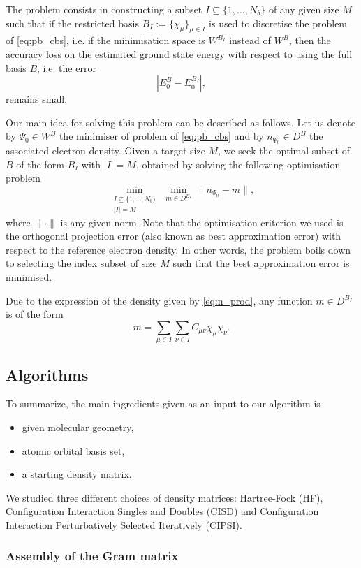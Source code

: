 \documentclass[a4paper,11pt]{article}
\begin{document}
The problem consists in constructing a subset $I\subseteq\{1,\ldots,N_b\}$ of
any given size $M$ such that if the restricted basis 
$B_I:=\{\chi_{\mu}\}_{\mu \in I}$ is used to discretise the problem of
\cref{eq:pb_cbs}, i.e. if the minimisation space is $W^{B_I}$ instead of $W^B$, 
then the accuracy loss on the estimated ground state energy with respect to 
using the full basis $B$, i.e. the error
\[
    |E_0^B - E_0^{B_I}|,
\]
remains small.

Our main idea for solving this problem can be described as follows. 
Let us denote by $\Psi_0\in W^B$ the minimiser of problem of \cref{eq:pb_cbs} 
and by $n_{\Psi_0}\in D^B$ the associated electron density. Given a target size
$M$, we seek the optimal subset of $B$ of the form $B_I$ with
$|I|=M$, obtained by solving the following optimisation problem
\[
    \min_{\substack{I\subseteq\{1,\ldots,N_b\} \\ |I|=M}}\,
    \min_{m\in D^{B_I}}\,\|n_{\Psi_0} - m\|,
\]
where $\|\cdot\|$ is any given norm. Note that the optimisation criterion 
we used is the orthogonal projection error (also known as best approximation
error) with respect to the reference electron density. 
In other words, the problem boils down to selecting the index subset of size
$M$ such that the best approximation error is minimised.

Due to the expression of the density given by \cref{eq:n_prod}, any function
$m\in D^{B_I}$ is of the form
\[
    m = \sum_{\mu\in I}\sum_{\nu\in I}C_{\mu\nu} \chi_{\mu}\chi_{\nu}.
\]

\subsection{Algorithms}

To summarize, the main ingredients given as an input to our algorithm is 
\begin{itemize}
    \item given molecular geometry,
    \item atomic orbital basis set,
    \item a starting density matrix.
\end{itemize}
We studied three different choices of density matrices: Hartree-Fock (HF),
Configuration Interaction Singles and Doubles (CISD) and
Configuration Interaction Perturbatively Selected Iteratively (CIPSI).

\subsubsection{Assembly of the Gram matrix}
\end{document}
